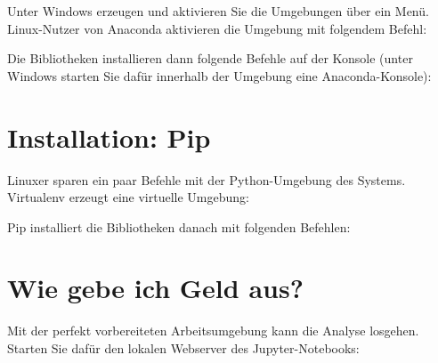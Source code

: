
\medskip


Unter Windows erzeugen und aktivieren Sie die Umgebungen über ein Menü. Linux-Nutzer von Anaconda aktivieren die Umgebung mit folgendem Befehl:

\medskip


\medskip


Die Bibliotheken installieren dann folgende Befehle auf der Konsole (unter Windows starten Sie dafür innerhalb der Umgebung eine Anaconda-Konsole):

\medskip





\medskip


\section{Installation: Pip}


Linuxer sparen ein paar Befehle mit der Python-Umgebung des Systems. Virtualenv erzeugt eine virtuelle Umgebung:

\medskip





\medskip


Pip installiert die Bibliotheken danach mit folgenden Befehlen:

\medskip





\medskip


\section{Wie gebe ich Geld aus?}

Mit der perfekt vorbereiteten Arbeitsumgebung kann die Analyse losgehen. Starten Sie dafür den lokalen Webserver des Jupyter-Notebooks:

